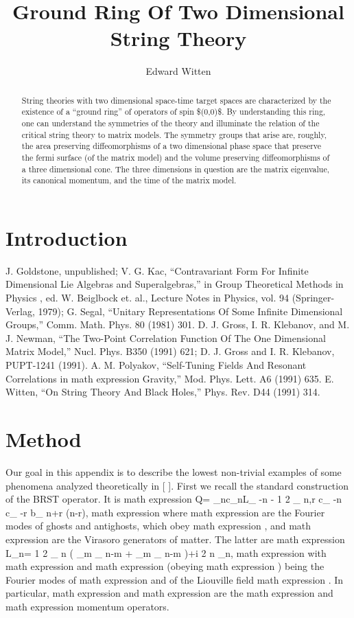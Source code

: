 \documentclass[11pt]{article}
\title{Ground Ring Of Two Dimensional String Theory}
\author{Edward Witten}
\date{}
\begin{document}
\maketitle
\begin{abstract}

String theories with two dimensional space-time target spaces are characterized by the existence of a ``ground ring'' of operators of spin \$(0,0)\$. By understanding this ring, one can understand the symmetries of the theory and illuminate the relation of the critical string theory to matrix models. The symmetry groups that arise are, roughly, the area preserving diffeomorphisms of a two dimensional phase space that preserve the fermi surface (of the matrix model) and the volume preserving diffeomorphisms of a three dimensional cone. The three dimensions in question are the matrix eigenvalue, its canonical momentum, and the time of the matrix model.

\end{abstract}

\section{Introduction}

J. Goldstone, unpublished; V. G. Kac, ``Contravariant Form For Infinite Dimensional Lie Algebras and Superalgebras,'' in Group Theoretical Methods in Physics , ed. W. Beiglbock et. al., Lecture Notes in Physics, vol. 94 (Springer-Verlag, 1979); G. Segal, ``Unitary Representations Of Some Infinite Dimensional Groups,'' Comm. Math. Phys. 80 (1981) 301. D. J. Gross, I. R. Klebanov, and M. J. Newman, ``The Two-Point Correlation Function Of The One Dimensional Matrix Model,'' Nucl. Phys. B350 (1991) 621; D. J. Gross and I. R. Klebanov, PUPT-1241 (1991). A. M. Polyakov, ``Self-Tuning Fields And Resonant Correlations in math expression Gravity,'' Mod. Phys. Lett. A6 (1991) 635. E. Witten, ``On String Theory And Black Holes,'' Phys. Rev. D44 (1991) 314.

\section{Method}

Our goal in this appendix is to describe the lowest non-trivial examples of some phenomena analyzed theoretically in [ ]. First we recall the standard construction of the BRST operator. It is math expression Q= \_nc\_nL\_ -n - 1 2 \_ n,r c\_ -n c\_ -r b\_ n+r (n-r), math expression where math expression are the Fourier modes of ghosts and antighosts, which obey math expression , and math expression are the Virasoro generators of matter. The latter are math expression L\_n= 1 2 \_ n ( \_m \_ n-m + \_m \_ n-m )+i 2 n \_n, math expression with math expression and math expression (obeying math expression ) being the Fourier modes of math expression and of the Liouville field math expression . In particular, math expression and math expression are the math expression and math expression momentum operators.
\end{document}
